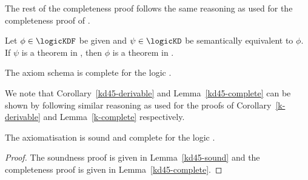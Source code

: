 The rest of the completeness proof follows the same reasoning as used for the
completeness proof of \axiomKF{}.

\begin{corollary}\label{kd45-derivable}
Let $\phi \in \logicKDF$ be given and $\psi \in \logicKD$ be semantically
equivalent to $\phi$.  If $\psi$ is a theorem in \logicKD{}, then $\phi$ is a
theorem in \axiomKDF{}.
\end{corollary}

\begin{lemma}\label{kd45-complete}
The axiom schema \axiomKDF{} is complete for the logic \logicKDF{}.
\end{lemma}

We note that Corollary~\ref{kd45-derivable} and Lemma~\ref{kd45-complete} can be
shown by following similar reasoning as used for the proofs of
Corollary~\ref{k-derivable} and Lemma~\ref{k-complete} respectively.

\begin{theorem}
The axiomatisation \axiomKDF{} is sound and complete for the logic \logicKDF{}.
\end{theorem}

\begin{proof}
The soundness proof is given in Lemma~\ref{kd45-sound} and the completeness
proof is given in Lemma~\ref{kd45-complete}.
\end{proof}
